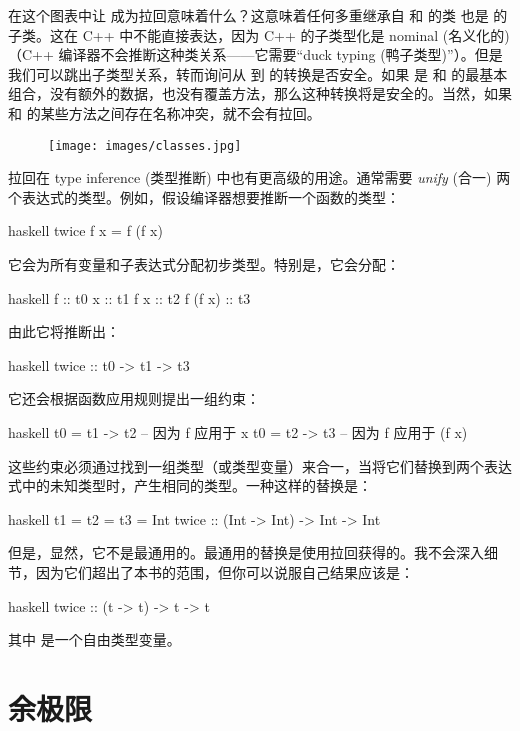 在这个图表中让  成为拉回意味着什么？这意味着任何多重继承自  和  的类  也是  的子类。这在 C++ 中不能直接表达，因为 C++ 的子类型化是 nominal (名义化的)（C++ 编译器不会推断这种类关系——它需要“duck typing (鸭子类型)”）。但是我们可以跳出子类型关系，转而询问从  到  的转换是否安全。如果  是  和  的最基本组合，没有额外的数据，也没有覆盖方法，那么这种转换将是安全的。当然，如果  和  的某些方法之间存在名称冲突，就不会有拉回。

\begin{figure}[H]
  \centering
  \texttt{[image: images/classes.jpg]}
\end{figure}

\noindent
拉回在 type inference (类型推断) 中也有更高级的用途。通常需要 \emph{unify} (合一) 两个表达式的类型。例如，假设编译器想要推断一个函数的类型：

\begin{snip}{haskell}
twice f x = f (f x)
\end{snip}
它会为所有变量和子表达式分配初步类型。特别是，它会分配：

\begin{snip}{haskell}
f       :: t0
x       :: t1
f x     :: t2
f (f x) :: t3
\end{snip}
由此它将推断出：

\begin{snip}{haskell}
twice :: t0 -> t1 -> t3
\end{snip}
它还会根据函数应用规则提出一组约束：

\begin{snip}{haskell}
t0 = t1 -> t2 -- 因为 f 应用于 x
t0 = t2 -> t3 -- 因为 f 应用于 (f x)
\end{snip}
这些约束必须通过找到一组类型（或类型变量）来合一，当将它们替换到两个表达式中的未知类型时，产生相同的类型。一种这样的替换是：

\begin{snip}{haskell}
t1 = t2 = t3 = Int
twice :: (Int -> Int) -> Int -> Int
\end{snip}
但是，显然，它不是最通用的。最通用的替换是使用拉回获得的。我不会深入细节，因为它们超出了本书的范围，但你可以说服自己结果应该是：

\begin{snip}{haskell}
twice :: (t -> t) -> t -> t
\end{snip}
其中  是一个自由类型变量。

\section{余极限}

